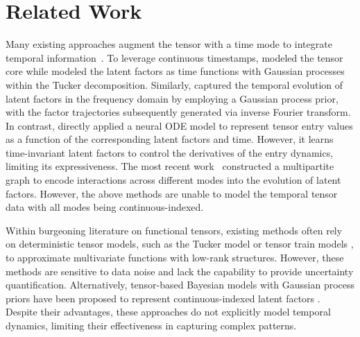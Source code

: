 \section{Related Work}
Many existing approaches  augment the tensor with a time mode  to integrate temporal information~\citep{Xiong_Chen_Huang_Schneider_Carbonell_2010, Rogers_Li_Russell_2013, Zhe_Zhang_Wang_Lee_Xu_Qi_Ghahramani_2016,post}.
To leverage continuous timestamps, \citet{bctt} modeled the tensor core while 
\citet{SFTL} modeled the latent factors 
as  time functions with Gaussian processes within the Tucker decomposition.  Similarly, \citet{NONFAT} captured the temporal evolution of latent factors in the frequency domain by employing a Gaussian process prior, with the factor trajectories subsequently generated via inverse Fourier transform.
In contrast,  \citet{thisode} directly applied a neural ODE model to represent tensor entry values as a function of the corresponding latent factors and time. However,  it learns time-invariant latent factors to control the derivatives of the entry dynamics, limiting its expressiveness. 
The most recent work~\citep{wang2024dynamictensor} constructed 
 a multipartite graph to encode interactions across different modes into the evolution of  latent factors. 
 However, the above  methods are unable to model the temporal tensor data with all modes being continuous-indexed. 




Within burgeoning literature on functional tensors, existing methods often rely on deterministic tensor models, such as the Tucker model \cite{luo2023lowrank} or tensor train models \cite{Gor_2015_tt, Big_2016_tt, Ballester-Ripoll_Paredes_Pajarola_2019_tt, chertkov2022optimization_tt, chertkov2023black_tt}, to approximate multivariate functions with low-rank structures. However, these methods are sensitive to  data noise and lack the capability to provide uncertainty quantification.
Alternatively, tensor-based Bayesian models with Gaussian process priors have been proposed to represent continuous-indexed latent factors \cite{Schmidt_2009_cp, fang2023functional}. Despite their advantages, these approaches do not explicitly model temporal dynamics, limiting their effectiveness in capturing complex patterns.


